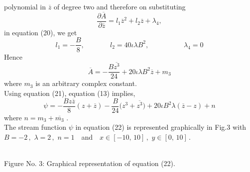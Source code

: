\documentclass[twocolumn,showpacs,preprintnumbers,amsmath,amssymb]{revtex4}
\begin{document}
polynomial in $\overline{z}$ of degree two and therefore on
substituting
\begin{equation}
\frac{\partial\overline{A}}{\partial\overline{z}}=l_{1}\overline{z}^{2}
+l_{2}\overline{z}+\lambda_{4},\nonumber
\end{equation}
in equation (20), we get
\begin{equation}
l_{1}=-\frac{B}{8},\,\,\,\,\,\,\,\,\,\,\,\,\,\,\,\,\,\,\,\,\,\,l_{2}=40\iota\lambda
B^{2},\,\,\,\,\,\,\,\,\,\,\,\,\,\,\,\,\,\,\,\,\,\,\,\,\,\,\,\,\,\,\lambda_{4}=0\nonumber
\end{equation}
Hence
\begin{equation}
\overline{A}=-\frac{B\overline{z^{3}}}{24}+20\iota\lambda
B^{2}\overline{z}+m_{3}
\end{equation}
where $m_{3}$  is an arbitrary complex constant.\\ Using equation
(21), equation (13) implies,
\begin{equation}
\psi=-\frac{Bz\overline{z}}{8}(z+\overline{z})-\frac{B}{24}\Big(z^{3}
+\overline{z^{3}}\Big)+20\iota B^{2}\lambda(\overline{z}-z)+n
\end{equation}
where $n = m_3 + \overline{m_3}$\,\,.\\ The stream function $\psi$
in equation (22) is represented graphically in Fig.3 with $B = -2\,
, \,\, \lambda = 2\, , \,\, n = 1$ \,\, and \,\, $x \in [-10 ,\,
10]\, ,\,\, y \in [0 ,\, 10]$\,.
\begin{center}
\\Figure No. 3: Graphical
representation of equation (22).
\end{center}
\end{document}

